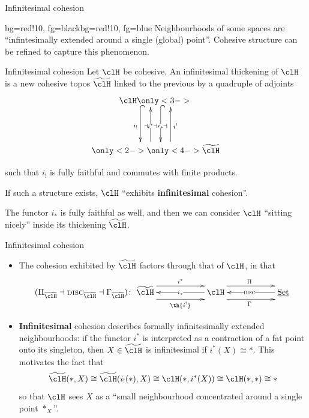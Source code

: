 \documentclass[presentation]{beamer}
\begin{document}
%
%
%
%
%
%
%
%
%
\begin{frame}{Infinitesimal cohesion}
	\begin{variableblock}{}{bg=red!10, fg=black}{bg=red!10, fg=blue}
		Neighbourhoods of some spaces are ``infintesimally extended around a single (global) point''. Cohesive structure can be refined to capture this phenomenon.
  \end{variableblock}
\end{frame}
\begin{frame}{Infinitesimal cohesion}
	Let $\clH$ be cohesive. An \alert{infinitesimal thickening} of $\clH$ is a new cohesive topos $\thH$ linked to the previous by a quadruple of adjoints
	\[
		\xymatrix@R=1.5cm{
		\clH
		\ar@{^{(}->}@<-18pt>[d]_{i_!}
		\only<3->{\ar@{^{(}->}@<6pt>[d]|{i_*}^\dashv}
		\\
		\ar@[white]@<-18pt>[u]_{\color{white}i^!}
		\only<2->{\ar@<6pt>[u]|{i^*}_\dashv^\dashv}
		\only<4->{\ar@<-18pt>[u]_{i^!}}
		\thH
		}
	\]

	\vspace*{\fill}
	such that $i_!$ is fully faithful and commutes with finite products.

	If such a structure exists, $\clH$ ``exhibits \textbf{infinitesimal} cohesion''.
	\onslide<6->
	\begin{myblock}{}
		The functor $i_*$ is fully faithful as well, and then we can consider $\clH$ ``sitting nicely'' inside its thickening $\thH$.
	\end{myblock}
\end{frame}
%
%
%
%
%
%
%
%
%
\begin{frame}{Infinitesimal cohesion}
	\begin{itemize}
		\item<+-> The cohesion exhibited by $\thH$ \alert{factors through} that of $\clH$, in that
		      \[
			      (\Pi_{\thH} \dashv \disc_{\thH} \dashv \Gamma_{\thH})
			      \colon
			      \xymatrix@C=2cm{
			      \thH \ar@<-8pt>[r]_{\th{i^!}} \ar@{<-}[r]|{i_*} \ar@<8pt>[r]^{i^*} &
			      \clH \ar@<-8pt>[r]_\Gamma \ar@{<-}[r]|{\disc} \ar@<8pt>[r]^\Pi &
			      \Set
			      }
		      \]
		\item<+-> \textbf{Infinitesimal} cohesion describes formally infinitesimally extended neighbourhoods: if the functor $i^*$ is interpreted as a \alert{contraction} of a fat point onto its singleton, then $X\in \thH$ is infinitesimal if $i^*(X)\cong *$. \onslide<+->This motivates the fact that
		      \[
			      \thH(*,X)\cong \thH(i_!(*),X)\cong \clH(*,i^*(X))\cong \clH(*,*)\cong *
		      \]
		      so that $\clH$ sees $X$ as a  ``small neighbourhood concentrated around a single point $*_X$''.
	\end{itemize}
\end{frame}
\end{document}
